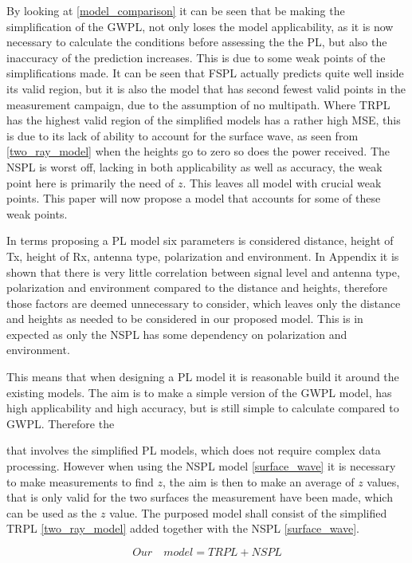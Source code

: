 
By looking at \autoref{model_comparison} it can be seen that be making the simplification of the GWPL, not only loses the model applicability, as it is now necessary to calculate the conditions before assessing the the PL, but also the inaccuracy of the prediction increases. This is due to some weak points of the simplifications made. It can be seen that FSPL actually predicts quite well inside its valid region, but it is also the model that has second fewest valid points in the measurement campaign, due to the assumption of no multipath. Where TRPL has the highest valid region of the simplified models has a rather high MSE, this is due to its lack of ability to account for the surface wave, as seen from \eqref{two_ray_model} when the heights go to zero so does the power received. The NSPL is worst off, lacking in both applicability as well as accuracy, the weak point here is primarily the need of $z$. This leaves all model with crucial weak points. This paper will now propose a model that accounts for some of these weak points. 


In terms proposing a PL model six parameters is considered distance, height of Tx, height of Rx, antenna type, polarization and environment. In Appendix it is shown that there is very little correlation between signal level and antenna type, polarization and environment compared to the distance and heights, therefore those factors are deemed unnecessary to consider, which leaves only the distance and heights as needed to be considered in our proposed model. This is in expected as only the NSPL has some dependency on polarization and environment. 

This means that when designing a PL model it is reasonable build it around the existing models. The aim is to make a simple version of the GWPL model, has high applicability and high accuracy, but is still simple to calculate compared to GWPL. Therefore the

that involves the simplified PL models, which does not require complex data processing. However when using the NSPL model \eqref{surface_wave} it is necessary to make measurements to find $z$, the aim is then to make an average of $z$ values, that is only valid for the two surfaces the measurement have been made, which can be used as the $z$ value. The purposed model shall consist of the simplified TRPL \eqref{two_ray_model} added together with the NSPL \eqref{surface_wave}.

\begin{equation}
Our \quad model = TRPL + NSPL
\end{equation}

